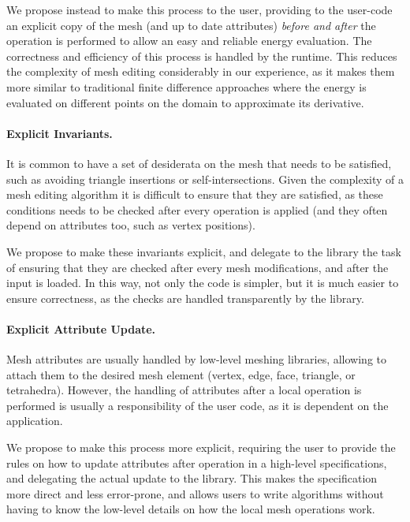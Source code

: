 We propose instead to make this process  to the user, providing to the user-code an explicit copy of the  mesh (and up to date attributes) \emph{before and after} the operation is performed to allow an easy and reliable energy evaluation. The correctness and efficiency of this process is handled by the runtime. This reduces the complexity of mesh editing considerably in our experience, as it makes them more similar to traditional finite difference approaches where the energy is evaluated on different points on the domain to approximate its derivative.

\paragraph{Explicit Invariants.}
It is common to have a set of desiderata on the mesh that needs to be satisfied, such as avoiding triangle insertions or self-intersections. Given the complexity of a mesh editing algorithm it is difficult to ensure that they are satisfied, as these conditions needs to be checked after every operation is applied (and they often depend on attributes too, such as vertex positions).

We propose to make these invariants explicit, and delegate to the library the task of ensuring that they are checked after every mesh modifications, and after the input is loaded. In this way, not only the code is simpler, but it is much easier to ensure correctness, as the checks are handled transparently by the library.

\paragraph{Explicit Attribute Update.}
Mesh attributes are usually handled by low-level meshing libraries, allowing to attach them to the desired mesh element (vertex, edge, face, triangle, or tetrahedra). However, the handling of attributes after a local operation is performed is usually a responsibility of the user code, as it is dependent on the application. 

We propose to make this process more explicit, requiring the user to provide the rules on how to update attributes after operation in a high-level specifications, and delegating the actual update to the library. This makes the specification more direct and less error-prone, and allows users to write algorithms without having to know the low-level details on how the local mesh operations work.

